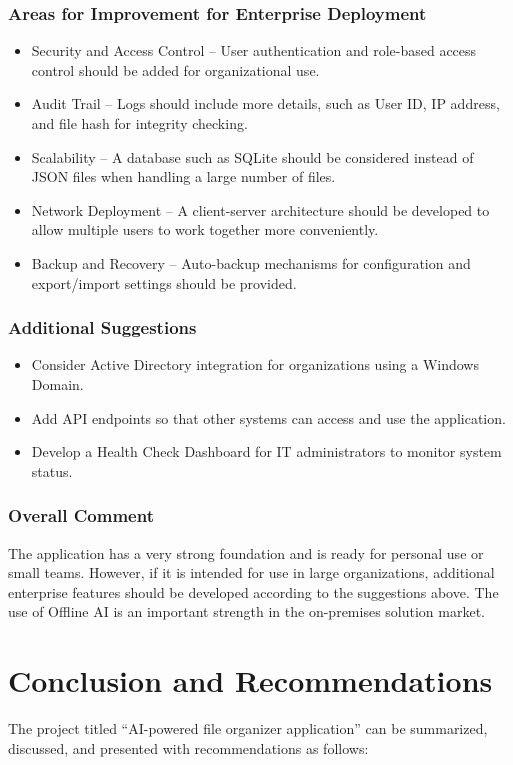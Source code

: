 \documentclass[12pt,oneside,openright,a4paper]{cpe-english-project}
\begin{document}
\subsection*{Areas for Improvement for Enterprise Deployment}
\begin{itemize}
\item Security and Access Control -- User authentication and role-based access control should be added for organizational use.
\item Audit Trail -- Logs should include more details, such as User ID, IP address, and file hash for integrity checking.
\item Scalability -- A database such as SQLite should be considered instead of JSON files when handling a large number of files.
\item Network Deployment -- A client-server architecture should be developed to allow multiple users to work together more conveniently.
\item Backup and Recovery -- Auto-backup mechanisms for configuration and export/import settings should be provided.
\end{itemize}
\subsection*{Additional Suggestions}
\begin{itemize}
\item Consider Active Directory integration for organizations using a Windows Domain.
\item Add API endpoints so that other systems can access and use the application.
\item Develop a Health Check Dashboard for IT administrators to monitor system status.
\end{itemize}
\subsection*{Overall Comment}
The application has a very strong foundation and is ready for personal use or small teams. However, if it is intended for use in large organizations, additional enterprise features should be developed according to the suggestions above. The use of Offline AI is an important strength in the on-premises solution market.

\chapter{Conclusion and Recommendations}
The project titled ``AI-powered file organizer application'' can be summarized, discussed, and presented with recommendations as follows:
\end{document}
